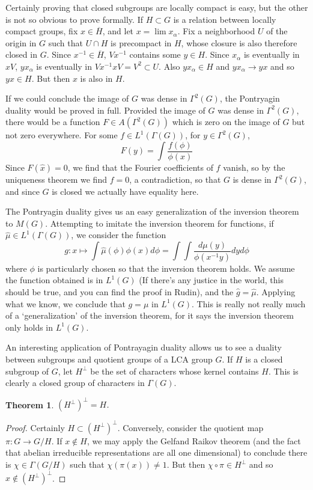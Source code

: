 \documentclass{article}
\theoremstyle{plain}
\newtheorem{theorem}{Theorem}
\theoremstyle{definition}
\begin{document}
Certainly proving that closed subgroups are locally compact is easy, but the other is not so obvious to prove formally. If $H \subset G$ is a relation between locally compact groups, fix $x \in \overline{H}$, and let $x = \lim x_\alpha$. Fix a neighborhood $U$ of the origin in $G$ such that $U \cap H$ is precompact in $H$, whose closure is also therefore closed in $G$. Since $x^{-1} \in \overline{H}$, $Vx^{-1}$ contains some $y \in H$. Since $x_\alpha$ is eventually in $xV$, $y x_\alpha$ is eventually in $Vx^{-1}xV = V^2 \subset U$. Also $yx_\alpha \in H$ and $yx_\alpha \to yx$ and so $yx \in H$. But then $x$ is also in $H$.

If we could conclude the image of $G$ was dense in $\Gamma^2(G)$, the Pontryagin duality would be proved in full. Provided the image of $G$ was dense in $\Gamma^2(G)$, there would be a function $F \in A(\Gamma^2(G))$ which is zero on the image of $G$ but not zero everywhere. For some $f \in L^1(\Gamma(G))$, for $y \in \Gamma^2(G)$,
%
\[ F(y) = \int \frac{f(\phi)}{\phi(x)} \]
%
Since $F(\hat{x}) = 0$, we find that the Fourier coefficients of $f$ vanish, so by the uniqueness theorem we find $f = 0$, a contradiction, so that $G$ is dense in $\Gamma^2(G)$, and since $G$ is closed we actually have equality here.

The Pontryagin duality gives us an easy generalization of the inversion theorem to $M(G)$. Attempting to imitate the inversion theorem for functions, if $\widehat{\mu} \in L^1(\Gamma(G))$, we consider the function
%
\[ g: x \mapsto \int \widehat{\mu}(\phi) \phi(x) d\phi = \int \int \frac{d\mu(y)}{\phi(x^{-1}y)} dy d\phi \]
%
where $\phi$ is particularly chosen so that the inversion theorem holds. We assume the function obtained is in $L^1(G)$ (If there's any justice in the world, this should be true, and you can find the proof in Rudin), and the $\hat{g} = \hat{\mu}$. Applying what we know, we conclude that $g = \mu$ in $L^1(G)$. This is really not really much of a `generalization' of the inversion theorem, for it says the inversion theorem only holds in $L^1(G)$.

An interesting application of Pontrayagin duality allows us to see a duality between subgroups and quotient groups of a LCA group $G$. If $H$ is a closed subgroup of $G$, let $H^\perp$ be the set of characters whose kernel contains $H$. This is clearly a closed group of characters in $\Gamma(G)$.

\begin{theorem}
    $(H^\perp)^\perp = H$.
\end{theorem}
\begin{proof}
    Certainly $H \subset (H^\perp)^\perp$. Conversely, consider the quotient map $\pi: G \to G/H$. If $x \not \in H$, we may apply the Gelfand Raikov theorem (and the fact that abelian irreducible representations are all one dimensional) to conclude there is $\chi \in \Gamma(G/H)$ such that $\chi(\pi(x)) \neq 1$. But then $\chi \circ \pi \in H^\perp$ and so $x \not \in (H^\perp)^\perp$.
\end{proof}
\end{document}
